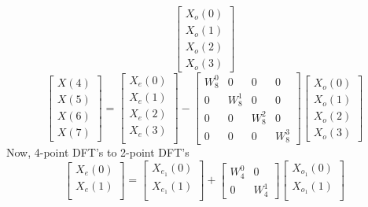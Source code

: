 \documentclass[journal,12pt,twocolumn]{IEEEtran}
\renewcommand\thesection{\arabic{section}}
\begin{document}
\begin{enumerate}[label=\thesection.\arabic*.,ref=\thesection.\theenumi]
\begin{equation}
\begin{bmatrix}
X_{o}(0) \\ 
X_{o}(1) \\ 
X_{o}(2) \\
X_{o}(3)
\end{bmatrix}
\end{equation}
\begin{equation}
\begin{bmatrix}
X(4) \\ 
X(5) \\ 
X(6) \\ 
X(7)
\end{bmatrix}
=
\begin{bmatrix}
X_{e}(0) \\ 
X_{e}(1)\\ 
X_{e}(2)\\
X_{e}(3)\\
\end{bmatrix}
-
\begin{bmatrix}
W^{0}_{8} & 0 & 0 & 0\\
0 & W^{1}_{8} & 0 & 0\\
0 & 0 & W^{2}_{8} & 0\\
0 & 0 & 0 & W^{3}_{8}
\end{bmatrix}
\begin{bmatrix}
X_{o}(0) \\ 
X_{o}(1) \\ 
X_{o}(2) \\
X_{o}(3)
\end{bmatrix}
\end{equation}
Now, 4-point DFT's to 2-point DFT's
\begin{equation}
\begin{bmatrix}
X_{e}(0) \\ 
X_{e}(1)\\ 
\end{bmatrix}
=
\begin{bmatrix}
X_{e_{1}}(0) \\ 
X_{e_{1}}(1)\\ 
\end{bmatrix}
+
\begin{bmatrix}
W^{0}_{4} & 0\\
0 & W^{1}_{4}
\end{bmatrix}
\begin{bmatrix}
X_{o_{1}}(0) \\ 
X_{o_{1}}(1) \\ 
\end{bmatrix}
\end{equation}
\begin{equation}

\end{equation}
\end{enumerate}
\end{document}
